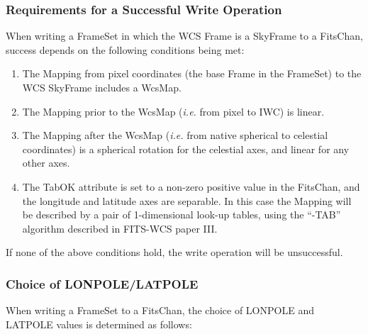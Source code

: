 \documentclass[twoside,11pt]{starlink}
\begin{document}
\subsubsection{Requirements for a Successful Write Operation}
When writing a FrameSet in which the WCS
Frame is a SkyFrame to a
FitsChan, success depends on the following conditions
being met:

\begin{enumerate}
\item The Mapping from pixel coordinates (the base Frame
in the FrameSet) to the WCS SkyFrame includes a WcsMap.
\item The Mapping prior to the WcsMap (\emph{i.e.} from pixel to IWC) is linear.
\item The Mapping after the WcsMap (\emph{i.e.} from native spherical to
celestial coordinates) is a spherical rotation for the
celestial axes, and linear for any other axes.
\item The TabOK attribute is set to a non-zero positive value in the FitsChan,
and the longitude and latitude axes are separable. In this case the Mapping will
be described by a pair of 1-dimensional look-up tables, using the ``-TAB''
algorithm described in FITS-WCS paper III.
\end{enumerate}

If none of the above conditions hold, the write operation will be
unsuccessful.

\subsubsection{Choice of LONPOLE/LATPOLE}
When writing a FrameSet to a FitsChan,
the choice of LONPOLE and LATPOLE values is determined as follows:
\end{document}
